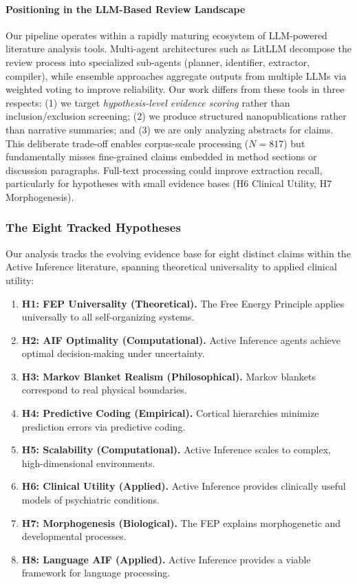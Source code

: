\documentclass[
  english,
]{article}
\providecommand{\tightlist}{%
  \setlength{\itemsep}{0pt}\setlength{\parskip}{0pt}}
\begin{document}
\paragraph{Positioning in the LLM-Based Review
Landscape}\label{positioning-in-the-llm-based-review-landscape}

Our pipeline operates within a rapidly maturing ecosystem of LLM-powered
literature analysis tools. Multi-agent architectures such as LitLLM
decompose the review process into specialized sub-agents (planner,
identifier, extractor, compiler), while ensemble approaches aggregate
outputs from multiple LLMs via weighted voting to improve reliability.
Our work differs from these tools in three respects: (1) we target
\emph{hypothesis-level evidence scoring} rather than inclusion/exclusion
screening; (2) we produce structured nanopublications rather than
narrative summaries; and (3) we are only analyzing abstracts for claims.
This deliberate trade-off enables corpus-scale processing (\(N = 817\))
but fundamentally misses fine-grained claims embedded in method sections
or discussion paragraphs. Full-text processing could improve extraction
recall, particularly for hypotheses with small evidence bases (H6
Clinical Utility, H7 Morphogenesis).

\subsubsection{The Eight Tracked
Hypotheses}\label{the-eight-tracked-hypotheses}

Our analysis tracks the evolving evidence base for eight distinct claims
within the Active Inference literature, spanning theoretical
universality to applied clinical utility:

\begin{enumerate}
\def\labelenumi{\arabic{enumi}.}
\tightlist
\item
  \textbf{H1: FEP Universality (Theoretical).} The Free Energy Principle
  applies universally to all self-organizing systems.
\item
  \textbf{H2: AIF Optimality (Computational).} Active Inference agents
  achieve optimal decision-making under uncertainty.
\item
  \textbf{H3: Markov Blanket Realism (Philosophical).} Markov blankets
  correspond to real physical boundaries.
\item
  \textbf{H4: Predictive Coding (Empirical).} Cortical hierarchies
  minimize prediction errors via predictive coding.
\item
  \textbf{H5: Scalability (Computational).} Active Inference scales to
  complex, high-dimensional environments.
\item
  \textbf{H6: Clinical Utility (Applied).} Active Inference provides
  clinically useful models of psychiatric conditions.
\item
  \textbf{H7: Morphogenesis (Biological).} The FEP explains
  morphogenetic and developmental processes.
\item
  \textbf{H8: Language AIF (Applied).} Active Inference provides a
  viable framework for language processing.
\end{enumerate}
\end{document}
